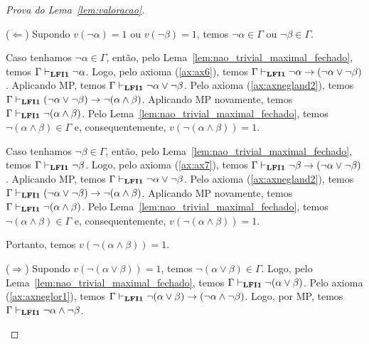 \begin{proof}[Prova do Lema~\ref{lem:valoracao}]
\begin{provaporcasos}
\begin{adjustwidth}{1cm}{}
                            \noindent ($\Longleftarrow$) Supondo $v(\neg \alpha) = 1$ ou $v(\neg \beta) = 1$, temos $\neg \alpha \in \Gamma$ ou $\neg \beta \in \Gamma$.

                            \noindent Caso tenhamos $\neg \alpha \in \Gamma$, então, pelo Lema~\ref{lem:nao_trivial_maximal_fechado}, temos $\Gamma \vdash_{{\normalfont\textbf{LFI1}}{}} \neg \alpha$. Logo, pelo axioma (\ref{ax:ax6}), temos $\Gamma \vdash_{{\normalfont\textbf{LFI1}}{}} \neg \alpha \to (\neg \alpha \lor \neg \beta)$. Aplicando MP, temos $\Gamma \vdash_{{\normalfont\textbf{LFI1}}{}} \neg \alpha \lor \neg \beta$. Pelo axioma (\ref{ax:axnegland2}), temos $\Gamma \vdash_{{\normalfont\textbf{LFI1}}{}} (\neg \alpha \lor \neg \beta) \to \neg (\alpha \land \beta)$. Aplicando MP novamente, temos $\Gamma \vdash_{{\normalfont\textbf{LFI1}}{}} \neg (\alpha \land \beta)$. Pelo Lema~\ref{lem:nao_trivial_maximal_fechado}, temos $\neg (\alpha \land \beta) \in \Gamma$ e, consequentemente, $v(\neg (\alpha \land \beta)) = 1$.

                            \noindent Caso tenhamos $\neg \beta \in \Gamma$, então, pelo Lema~\ref{lem:nao_trivial_maximal_fechado}, temos $\Gamma \vdash_{{\normalfont\textbf{LFI1}}{}} \neg \beta$. Logo, pelo axioma (\ref{ax:ax7}), temos $\Gamma \vdash_{{\normalfont\textbf{LFI1}}{}} \neg \beta \to (\neg \alpha \lor \neg \beta)$. Aplicando MP, temos $\Gamma \vdash_{{\normalfont\textbf{LFI1}}{}} \neg \alpha \lor \neg \beta$. Pelo axioma (\ref{ax:axnegland2}), temos $\Gamma \vdash_{{\normalfont\textbf{LFI1}}{}} (\neg \alpha \lor \neg \beta) \to \neg (\alpha \land \beta)$. Aplicando MP novamente, temos $\Gamma \vdash_{{\normalfont\textbf{LFI1}}{}} \neg (\alpha \land \beta)$. Pelo Lema~\ref{lem:nao_trivial_maximal_fechado}, temos $\neg (\alpha \land \beta) \in \Gamma$ e, consequentemente, $v(\neg (\alpha \land \beta)) = 1$.

                            Portanto, temos $v(\neg (\alpha \land \beta)) = 1$.

                        \end{adjustwidth}


                        \begin{adjustwidth}{1cm}{}
                            
                            \noindent ($\Longrightarrow$) Supondo $v(\neg (\alpha \lor \beta)) = 1$, temos $\neg (\alpha \lor \beta) \in \Gamma$. Logo, pelo Lema~\ref{lem:nao_trivial_maximal_fechado}, temos $\Gamma \vdash_{{\normalfont\textbf{LFI1}}{}} \neg (\alpha \lor \beta)$. Pelo axioma (\ref{ax:axneglor1}), temos $\Gamma \vdash_{{\normalfont\textbf{LFI1}}{}} \neg (\alpha \lor \beta) \to (\neg \alpha \land \neg \beta)$. Logo, por MP, temos $\Gamma \vdash_{{\normalfont\textbf{LFI1}}{}} \neg \alpha \land \neg \beta$.


\end{adjustwidth}
\end{provaporcasos}
\end{proof}
